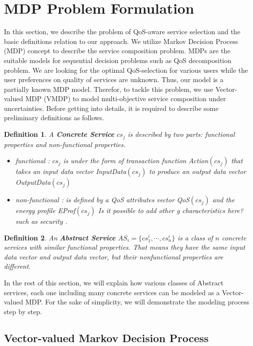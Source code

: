 \documentclass[10pt,journal,compsoc]{IEEEtran}
\newtheorem{definition}{Definition}
\begin{document}
\section{MDP Problem Formulation}

In this section, we describe the problem of QoS-aware service selection and the basic definitions relation to our approach.
 We utilize Markov Decision Process (MDP) concept to describe the service composition problem. MDPs are the suitable models for sequential decision problems such as QoS decomposition problem. We are looking for the optimal QoS-selection for various users while the user preferences on quality of services are unknown. Thus, our model is a partially known MDP model. Therefor, to tackle this problem, we use Vector-valued MDP (VMDP) to model multi-objective service composition under uncertainties. Before getting into details, it is required to describe some preliminary definitions as follows. 

\begin{definition}
A \textbf{Concrete Service} $cs_j$ is described by two parts: functional properties and non-functional properties.
\begin{itemize}
\item functional : $cs_j$ is under the form of transaction function Action$(cs_j)$ that takes an input data vector InputData$(cs_j)$ to produce an output data vector OutputData$(cs_j)$ 
\item non-functional : is defined by a QoS attributes vector QoS$(cs_j)$ and the energy profile EProf$(cs_j)$ {\color{red} Is it possible to add other g
characteristics here? such as security }.  
\end{itemize}
\end{definition}

\begin{definition}
An \textbf{Abstract Service} $AS_i = \{ cs_1^i, \cdots, cs_n^i \}$ is a class of $n$ concrete services with similar functional properties. That means they have the same input data vector and output data vector, but their nonfunctional properties are different. 
\end{definition}

In the rest of this section, we will explain how various classes of Abstract services, each one including many concrete services can be modeled as a Vector-valued MDP. For the sake of simplicity, we will demonstrate the modeling process step by step. 



\subsection{Vector-valued Markov Decision Process}
\end{document}
